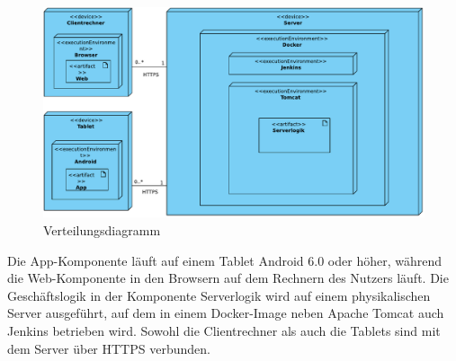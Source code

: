 \begin{figure}[h]
	\centering
	\includegraphics[width=\textwidth]{img/Diagramme/Verteilung}		
	\caption{Verteilungsdiagramm}
	\label{fig:verteilungsdiagramm}
\end{figure}
\noindent
Die App-Komponente läuft auf einem Tablet Android 6.0 oder höher, während 
die Web-Komponente  in den Browsern auf dem Rechnern des Nutzers läuft.
Die Geschäftslogik in der Komponente Serverlogik wird auf einem physikalischen Server ausgeführt, auf dem in einem Docker-Image neben Apache Tomcat auch Jenkins betrieben wird.
Sowohl die Clientrechner als auch die Tablets sind mit dem Server über HTTPS verbunden.

\newpage
